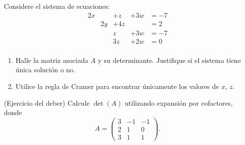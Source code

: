 \documentclass[10pt,a4]{examenEPN0}
\begin{document}
\begin{preguntas}
\newpage

\item Considere el sistema de ecuaciones: 
\[
\begin{array}{ccccc}
     2x& &+z&+3w&=-7 \\
     &2y &+4z&&=2 \\
     & &z&+3w&=-7 \\
     & &3z&+2w&=0 \\
\end{array}
\]
\begin{enumerate}
    \item Halle la matriz asociada \(A\) y su determinante. Justifique si el sistema tiene única solución o no. 
    \item Utilice la regla de Cramer para encontrar únicamente los valores de \(x\), \(z\). 
\end{enumerate}

\newpage

\item (Ejercicio del deber)    Calcule $\det(A)$ utilizando expansión por cofactores, donde 
\[
A = \begin{pmatrix}
3 & -1 & -1 \\
2 & 1 & 0 \\
3 & 1 & 1
\end{pmatrix}.
\]
\end{preguntas}
\final
\end{document}
